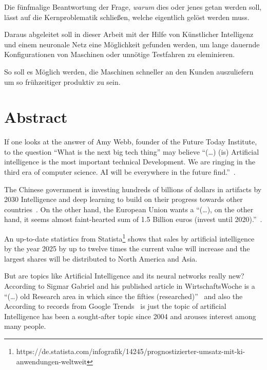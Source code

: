 Die fünfmalige Beantwortung der Frage, \textit{warum} dies oder jenes getan werden soll, lässt auf die Kernproblematik
schließen, welche eigentlich gelöst werden muss.

Daraus abgeleitet soll in dieser Arbeit mit der Hilfe von Künstlicher Intelligenz und einem neuronale Netz eine
Möglichkeit gefunden werden, um lange dauernde Konfigurationen von Maschinen oder unnötige Testfahren zu eleminieren.

So soll es Möglich werden, die Maschinen schneller an den Kunden auszuliefern um so frühzeitiger produktiv zu sein.

\newpage


\section{Abstract}
\label{sec:abstract}
If one looks at the answer of Amy Webb, founder of the Future Today Institute, to the question \enquote{What is the next
big tech thing} may believe \enquote{(\ldots) (is) Artificial intelligence is the most important technical Development.
We are ringing in the third era of computer science. AI will be everywhere in the future find.}~\cite{article_einleitung_dub_aw}.

The Chinese government is investing hundreds of billions of dollars in artifacts by 2030 Intelligence and deep learning
to build on their progress towards other countries~\cite{article_einleitung_css}. On the other hand, the European Union
wants a \enquote{(\ldots), on the other hand, it seems almost faint-hearted sum of 1.5 Billion euros (invest until
2020).}~\cite{article_einleitung_ww_sg}.

An up-to-date statistics from Statista\footnote{https://de.statista.com/infografik/14245/prognostizierter-umsatz-mit-ki-anwendungen-weltweit}
shows that sales by artificial intelligence by the year 2025 by up to twelve times the current value will increase and
the largest shares will be distributed to North America and Asia.

But are topics like Artificial Intelligence and its neural networks really new? According to Sigmar Gabriel and his
published article in WirtschaftsWoche is a \enquote{(\ldots) old Research area in which since the fifties
(researched)}~\cite{article_einleitung_ww_sg} and also the According to records from Google
Trends~\cite{online_einleitung_googletrends} is just the topic of artificial Intelligence has been a sought-after topic
since 2004 and arouses interest among many people.

